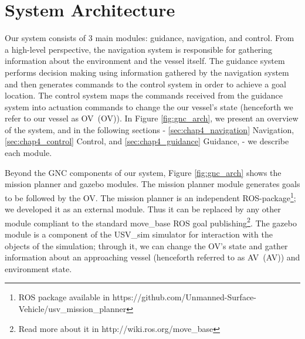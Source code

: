 \section{System Architecture}
\label{sec:sys_arch}

    Our system consists of 3 main modules: guidance, navigation, and control. From a high-level perspective, the navigation system is responsible for gathering information about the environment and the vessel itself. The guidance system performs decision making using information gathered by the navigation system and then generates commands to the control system in order to achieve a goal location. The control system maps the commands received from the guidance system into actuation commands to change the our vessel's state (henceforth we refer to our vessel as \acl{OV}~(\ac{OV})). In Figure \ref{fig:gnc_arch}, we present an overview of the system, and in the following sections - \ref{sec:chap4_navigation} Navigation, \ref{sec:chap4_control} Control, and \ref{sec:chap4_guidance} Guidance, - we describe each module.

    Beyond the \ac{GNC} components of our system, Figure \ref{fig:gnc_arch} shows the mission planner and gazebo modules. The mission planner module generates goals to be followed by the \ac{OV}. The mission planner is an independent ROS-package\footnote{ROS package available in https://github.com/Unmanned-Surface-Vehicle/usv\_mission\_planner}; we developed it as an external module. Thus it can be replaced by any other module compliant to the standard move\_base ROS goal publishing\footnote{Read more about it in http://wiki.ros.org/move\_base}. The gazebo module is a component of the USV\_sim simulator for interaction with the objects of the simulation; through it, we can change the \ac{OV}'s state and gather information about an approaching vessel (henceforth referred to as \acl{AV}~(\ac{AV})) and environment state.

